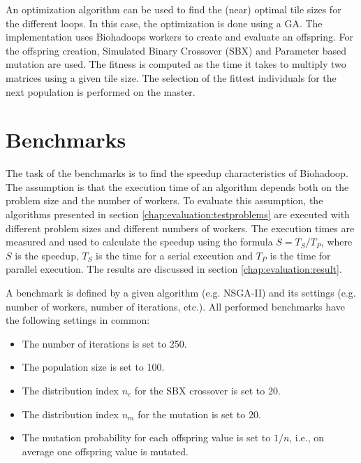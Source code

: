 An optimization algorithm can be used to find the (near) optimal tile sizes for the different loops. In this case, the optimization is done using a GA. The implementation uses Biohadoops workers to create and evaluate an offspring. For the offspring creation, Simulated Binary Crossover (SBX) and Parameter based mutation are used. The fitness is computed as the time it takes to multiply two matrices using a given tile size. The selection of the fittest individuals for the next population is performed on the master.

\section{Benchmarks}
\label{chap:evaluation:benchmarks}
The task of the benchmarks is to find the speedup characteristics of Biohadoop. The assumption is that the execution time of an algorithm depends both on the problem size and the number of workers. To evaluate this assumption, the algorithms presented in section \ref{chap:evaluation:testproblems} are executed with different problem sizes and different numbers of workers. The execution times are measured and used to calculate the speedup using the formula $S = T_S / T_P$, where $S$ is the speedup, $T_S$ is the time for a serial execution and $T_P$ is the time for parallel execution. The results are discussed in section \ref{chap:evaluation:result}.


A benchmark is defined by a given algorithm (e.g. NSGA-II) and its settings (e.g. number of workers, number of iterations, etc.). All performed benchmarks have the following settings in common:
\begin{itemize}
  \item The number of iterations is set to 250.
  \item The population size is set to 100.
  \item The distribution index $n_c$ for the SBX crossover is set to 20.
  \item The distribution index $n_m$ for the mutation is set to 20.
  \item The mutation probability for each offspring value is set to $1/n$, i.e., on average one offspring value is mutated.
\end{itemize}

